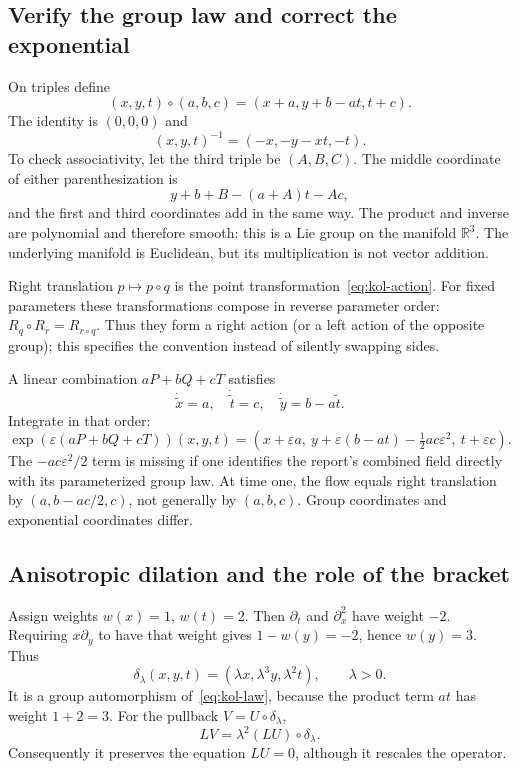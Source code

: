 \documentclass[11pt,a4paper]{article}
\numberwithin{equation}{section}
\theoremstyle{definition}
\theoremstyle{plain}
\theoremstyle{remark}
\newcommand{\R}{\mathbb R}
\begin{document}
\subsection{Verify the group law and correct the exponential}
On triples define
\begin{equation}\label{eq:kol-law}
(x,y,t)\circ(a,b,c)=(x+a,y+b-at,t+c).
\end{equation}
The identity is $(0,0,0)$ and
\[
(x,y,t)^{-1}=(-x,-y-xt,-t).
\]
To check associativity, let the third triple be $(A,B,C)$. The middle coordinate of either parenthesization is
\[
y+b+B-(a+A)t-Ac,
\]
and the first and third coordinates add in the same way. The product and inverse are polynomial and therefore smooth: this is a Lie group on the manifold $\R^3$. The underlying manifold is Euclidean, but its multiplication is not vector addition.

Right translation $p\mapsto p\circ q$ is the point transformation~\eqref{eq:kol-action}. For fixed parameters these transformations compose in reverse parameter order: $R_q\circ R_r=R_{r\circ q}$. Thus they form a right action (or a left action of the opposite group); this specifies the convention instead of silently swapping sides.

A linear combination $aP+bQ+cT$ satisfies
\[
\dot{\widetilde x}=a,\quad \dot{\widetilde t}=c,\quad
\dot{\widetilde y}=b-a\widetilde t.
\]
Integrate in that order:
\begin{equation}\label{eq:kol-flow}
\boxed{\exp(\varepsilon(aP+bQ+cT))(x,y,t)
=(x+\varepsilon a,\ y+\varepsilon(b-at)-\tfrac12ac\varepsilon^2,\ t+\varepsilon c).}
\end{equation}
The $-ac\varepsilon^2/2$ term is missing if one identifies the report's combined field directly with its parameterized group law. At time one, the flow equals right translation by $(a,b-ac/2,c)$, not generally by $(a,b,c)$. Group coordinates and exponential coordinates differ.

\subsection{Anisotropic dilation and the role of the bracket}
Assign weights $w(x)=1$, $w(t)=2$. Then $\partial_t$ and $\partial_x^2$ have weight $-2$. Requiring $x\partial_y$ to have that weight gives $1-w(y)=-2$, hence $w(y)=3$. Thus
\[
\delta_\lambda(x,y,t)=(\lambda x,\lambda^3y,\lambda^2t),\qquad\lambda>0.
\]
It is a group automorphism of~\eqref{eq:kol-law}, because the product term $at$ has weight $1+2=3$. For the pullback $V=U\circ\delta_\lambda$,
\[
LV=\lambda^2(LU)\circ\delta_\lambda.
\]
Consequently it preserves the equation $LU=0$, although it rescales the operator.
\end{document}
